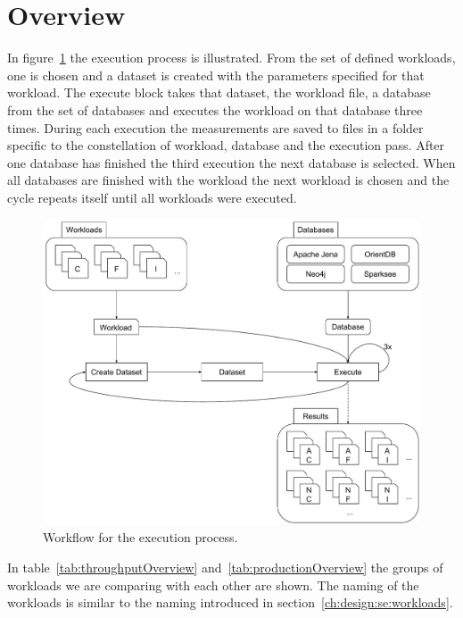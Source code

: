 \section{Overview}
\label{ch:evaluation:se:overview}
In figure~\ref{fig:executionWorkflow} the execution process is illustrated.
From the set of defined workloads,
one is chosen and a dataset is created with the parameters specified for that workload.
The execute block takes that dataset,
the workload file,
a database from the set of databases and executes the workload on that database three times.
During each execution the measurements are saved to files in a folder specific to the constellation of workload,
database and the execution pass.
After one database has finished the third execution the next database is selected.
When all databases are finished with the workload the next workload is chosen and the cycle repeats itself until all workloads were executed.

\begin{figure}[!h]
  \includegraphics[width=\textwidth]{images/executionWorkflow}
  \caption{Workflow for the execution process.}
  \label{fig:executionWorkflow}
\end{figure}

In table~\ref{tab:throughputOverview} and~\ref{tab:productionOverview} the groups of workloads we are comparing with each other are shown.
The naming of the workloads is similar to the naming introduced in section~\ref{ch:design:se:workloads}.


